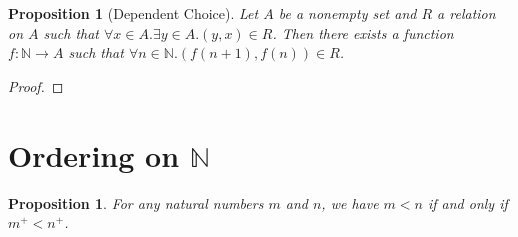 \documentclass{book}
\let\qed\relax
\newtheorem{prop}[ax]{Proposition}
\theoremstyle{definition}
\begin{document}
\begin{prop}[Dependent Choice]
Let $A$ be a nonempty set and $R$ a relation on $A$ such that $\forall x \in A. \exists y \in A. (y,x) \in R$. Then there exists a function $f : \mathbb{N} \rightarrow A$ such that $\forall n \in \mathbb{N}. (f(n+1),f(n)) \in R$.
\end{prop}

\begin{proof}
\pf
{}
\qed
\end{proof}

\section{Ordering on $\mathbb{N}$}

\begin{prop}
\label{prop:succltsucc}
For any natural numbers $m$ and $n$, we have $m < n$ if and only if $m^+ < n^+$.
\end{prop}
\end{document}
